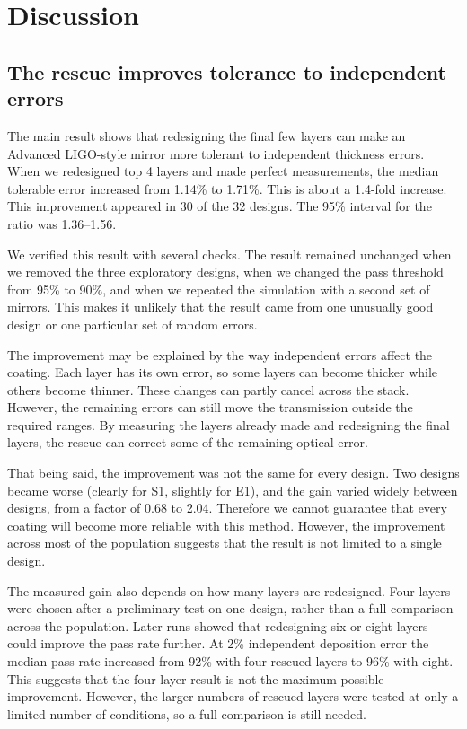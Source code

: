 \section{Discussion}
\label{sec:discussion}

\subsection{The rescue improves tolerance to independent errors}

The main result shows that redesigning the final few layers can make an Advanced LIGO-style mirror more tolerant to independent thickness errors. When we redesigned top 4 layers and made perfect measurements, the median tolerable error increased from 1.14\% to 1.71\%. This is about a 1.4-fold increase. This improvement appeared in 30 of the 32 designs. The 95\% interval for the ratio was 1.36--1.56.

We verified this result with several checks. The result remained unchanged when we removed the three exploratory designs, when we changed the pass threshold from 95\% to 90\%, and when we repeated the simulation with a second set of mirrors. This makes it unlikely that the result came from one unusually good design or one particular set of random errors.

The improvement may be explained by the way independent errors affect the coating. Each layer has its own error, so some layers can become thicker while others become thinner. These changes can partly cancel across the stack. However, the remaining errors can still move the transmission outside the required ranges. By measuring the layers already made and redesigning the final layers, the rescue can correct some of the remaining optical error.

That being said, the improvement was not the same for every design. Two designs became worse (clearly for S1, slightly for E1), and the gain varied widely between designs, from a factor of 0.68 to 2.04. Therefore we cannot guarantee that every coating will become more reliable with this method. However, the improvement across most of the population suggests that the result is not limited to a single design.

The measured gain also depends on how many layers are redesigned. Four layers were chosen after a preliminary test on one design, rather than a full comparison across the population. Later runs showed that redesigning six or eight layers could improve the pass rate further. At 2\% independent deposition error the median pass rate increased from 92\% with four rescued layers to 96\% with eight. This suggests that the four-layer result is not the maximum possible improvement. However, the larger numbers of rescued layers were tested at only a limited number of conditions, so a full comparison is still needed.


